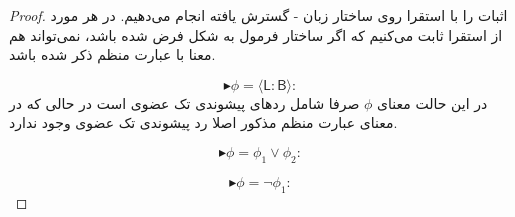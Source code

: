 \begin{proof}
	اثبات را با استقرا روی ساختار زبان - گسترش یافته انجام می‌دهیم. در هر مورد از استقرا ثابت می‌کنیم که اگر ساختار فرمول به شکل فرض شده باشد، نمی‌تواند هم معنا با عبارت منظم ذکر شده باشد.
	
	$$\blacktriangleright \phi = \mathsf{\langle L:B \rangle}:$$
	در این حالت معنای $\phi$ صرفا شامل ردهای پیشوندی تک عضوی است در حالی که در معنای عبارت منظم مذکور اصلا رد پیشوندی تک عضوی وجود ندارد.
	
	$$\blacktriangleright \phi = \phi_1 \lor \phi_2:$$
	
	
	$$\blacktriangleright \phi = \neg \phi_1:$$
	
	
	
\end{proof}


























